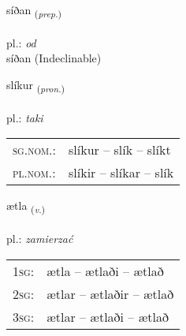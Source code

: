 \documentclass[frontgrid, backgrid]{flacards}\usepackage[]{graphicx}\usepackage[]{xcolor}
\begin{document}
{síðan \small{\textsubscript{(\textit{prep.})}} \\[1ex]
\textphonetic{[siːðan]} \\
pl.: \emph{od} \\  [2ex]
síðan (Indeclinable)}

\renewcommand{\flhead}{\vskip5pt \fboxsep=0pt {\small\bfseries\footnotesize Fornafn | zaimek}}
\renewcommand{\fcfoot}{\vskip5pt \fboxsep=0pt \hspace{2pt}{\small\bfseries\footnotesize 1K}}

\renewcommand{\blhead}{\vskip5pt {\small\bfseries\footnotesize Fornafn | zaimek }}
\renewcommand{\bcfoot}{\vskip5pt \hspace{2pt}{\small\bfseries\footnotesize 1K}}


{slíkur \small{\textsubscript{(\textit{pron.})}} \\[1ex] %
\textphonetic{[stliːkʏr]} \\
pl.: \emph{taki} \\  [2ex]
\renewcommand*{\arraystretch}{0.8}
\begin{tabular}{ll}
\textsc{sg.nom.}: & slíkur  --  slík -- slíkt \\ 
\textsc{pl.nom.}: & slíkir -- slíkar -- slík
\end{tabular}
}

\renewcommand{\flhead}{\vskip5pt \fboxsep=0pt {\small\bfseries\footnotesize Sagnorð | czasownik}}
\renewcommand{\fcfoot}{\vskip5pt \fboxsep=0pt \hspace{2pt}{\small\bfseries\footnotesize 1K}}

\renewcommand{\blhead}{\vskip5pt {\small\bfseries\footnotesize Sagnorð | czasownik }}
\renewcommand{\bcfoot}{\vskip5pt \hspace{2pt}{\small\bfseries\footnotesize 1K}}


{ætla \small{\textsubscript{(\textit{v.})}} \\[1ex] %
\textphonetic{[aihtla]} \\
pl.: \emph{zamierzać} \\  [2ex]
\renewcommand*{\arraystretch}{0.8}
\begin{tabular}{p{1cm}l}
\textsc{1sg}: & ætla -- ætlaði -- ætlað \\ 
\textsc{2sg}: & ætlar -- ætlaðir -- ætlað \\ 
\textsc{3sg}: & ætlar -- ætlaði -- ætlað \\ 
\end{tabular}
}
\end{document}
